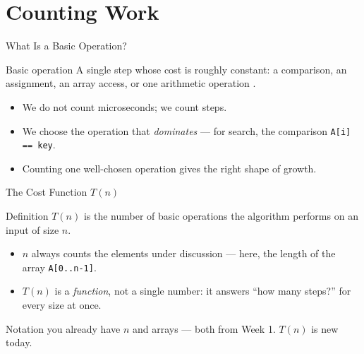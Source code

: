\documentclass[aspectratio=169]{beamer}
\begin{document}

\section{Counting Work}


\begin{frame}{What Is a Basic Operation?}
  \begin{block}{Basic operation}
    A single step whose cost is roughly constant: a comparison, an assignment,
    an array access, or one arithmetic operation
    \cite{Sedgewick2011_algorithms}.
  \end{block}
  \begin{itemize}
    \item We do not count microseconds; we count steps.
    \item We choose the operation that \emph{dominates} --- for search, the
      comparison \texttt{A[i] == key}.
    \item Counting one well-chosen operation gives the right shape of growth.
  \end{itemize}
  \vspace{0.15cm}
\end{frame}

\begin{frame}{The Cost Function $T(n)$}
  \begin{block}{Definition}
    $T(n)$ is the number of basic operations the algorithm performs on an
    input of size $n$.
  \end{block}
  \begin{itemize}
    \item $n$ always counts the elements under discussion --- here, the length
      of the array \texttt{A[0..n-1]}.
    \item $T(n)$ is a \emph{function}, not a single number: it answers ``how
      many steps?'' for every size at once.
  \end{itemize}
  \begin{exampleblock}{Notation you already have}
    $n$ and arrays --- both from Week 1. $T(n)$ is new today.
  \end{exampleblock}
\end{frame}
\end{document}
